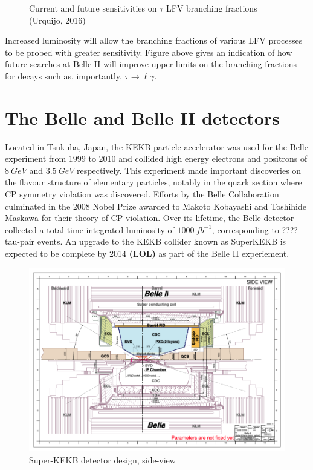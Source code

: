 \documentclass[12pt]{thesis}  %
\newcommand{\tlg}{\tau\to\ell\gamma}
\begin{document}
\begin{figure}[h]
\centering
\caption{Current and future sensitivities on $\tau$ LFV branching fractions (Urquijo, 2016)}
\end{figure}

Increased luminosity will allow the branching fractions of various LFV processes to be probed with greater sensitivity. Figure above gives an indication of how future searches at Belle II will improve upper limits on the branching fractions for decays such as, importantly, $\tlg$.



\chapter{The Belle and Belle II detectors}

Located in Tsukuba, Japan, the KEKB particle accelerator was used for the Belle experiment from 1999 to 2010 and collided high energy electrons and positrons of $\SI{8}{GeV}$ and $\SI{3.5}{GeV}$ respectively. This experiment made important discoveries on the flavour structure of elementary particles, notably in the quark section where CP symmetry violation was discovered. Efforts by the Belle Collaboration culminated in the 2008 Nobel Prize awarded to Makoto Kobayashi and Toshihide Maskawa for their theory of CP violation. Over its lifetime, the Belle detector collected a total time-integrated luminosity of $\SI{1000}{fb^{-1}}$, corresponding to ???? tau-pair events. An upgrade to the KEKB collider known as SuperKEKB is expected to be complete by 2014 \textbf{(LOL)} as part of the Belle II experiement.

\begin{figure}[h]
\centering
\includegraphics[width=0.7\linewidth]{images/super-kekb-side-view.png}
\caption{Super-KEKB detector design, side-view}
\label{}
\end{figure}
\end{document}
